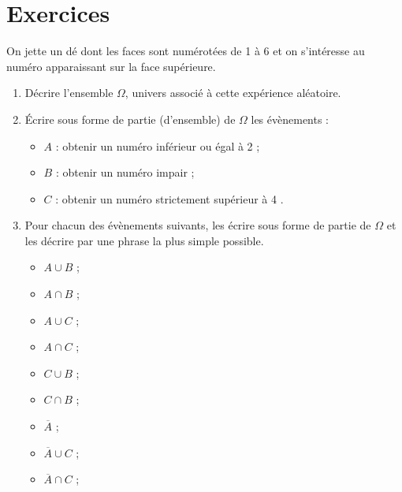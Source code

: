 \section{Exercices}



\begin{exo}
On jette un d\'e dont les faces sont num\'erot\'ees de 1 \`a 6 et on s'int\'eresse au num\'ero apparaissant sur la face sup\'erieure.
\begin{enumerate}
	\item D\'ecrire l'ensemble $\Omega$, univers associ\'e \`a cette exp\'erience al\'eatoire.
	\item \'Ecrire sous forme de partie (d'ensemble) de $\Omega$ les \'ev\`enements :
\begin{itemize}
	\item $A$ : \og obtenir un num\'ero inf\'erieur ou \'egal \`a 2 \fg ;
	\item $B$ : \og obtenir un num\'ero impair \fg ;
	\item $C$ : \og obtenir un num\'ero strictement sup\'erieur \`a 4 \fg.
\end{itemize}
\item Pour chacun des \'ev\`enements suivants, les \'ecrire sous forme de partie de $\Omega$ et les d\'ecrire par une phrase la plus simple possible.
\vspace{-1em}\begin{multicols}{5}
\begin{itemize}
	\item $A\cup B$ ;
	\item $A\cap B$ ;
	\item $A\cup C$ ;
	\item $A\cap C$ ;
	\item $C\cup B$ ;
	\item $C\cap B$ ;
	\item $\overline{A}$ ;
	\item $\overline{A}\cup C$ ;
	\item $\overline{A}\cap C$ ;
\end{itemize}
\end{multicols}\vspace{-1em}
\end{enumerate}
\end{exo}

